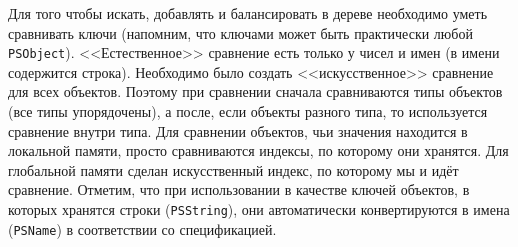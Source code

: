 Для того чтобы искать, добавлять и балансировать в дереве необходимо уметь сравнивать ключи (напомним, что ключами может быть практически любой \texttt{PSObject}). <<Естественное>> сравнение есть только у чисел и имен (в имени содержится строка). Необходимо было создать <<искусственное>> сравнение для всех объектов. Поэтому при сравнении сначала сравниваются типы объектов (все типы упорядочены), а после, если объекты разного типа, то используется сравнение внутри типа. Для сравнении объектов, чьи значения находится в локальной памяти, просто сравниваются индексы, по которому они хранятся. Для глобальной памяти сделан искусственный индекс, по которому мы и идёт сравнение. Отметим, что при использовании в качестве ключей объектов, в которых хранятся строки (\texttt{PSString}), они автоматически конвертируются в имена (\texttt{PSName}) в соответствии со спецификацией.

